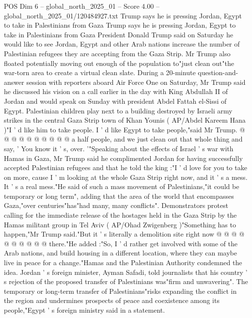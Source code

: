 \begin{textsample}{POS Dim 6 – global\_north\_2025\_01 – Score 4.00 – global\_north\_2025\_01/120484927.txt}  \label{ex:f6_pos_350}
Trump says he is pressing Jordan, Egypt to take in Palestinians from Gaza Trump says he is pressing Jordan, Egypt to take in Palestinians from Gaza President Donald Trump said on Saturday he would like to see Jordan, Egypt and other Arab nations increase the number of Palestinian refugees they are accepting from the Gaza Strip.
Mr Trump also floated potentially moving out enough of the population to"just clean out"the war-torn area to create a virtual clean slate.
During a 20-minute question-and-answer session with reporters aboard Air Force One on Saturday, Mr Trump said he discussed his vision on a call earlier in the day with King Abdullah II of Jordan and would speak on Sunday with president Abdel Fattah el-Sissi of Egypt.
Palestinian children play next to a building destroyed by Israeli army strikes in the central Gaza Strip town of Khan Younis ( AP/Abdel Kareem Hana )"I ' d like him to take people.
I ' d like Egypt to take people,"said Mr Trump. @ @ @ @ @ @ @ @ @ @ a half people, and we just clean out that whole thing and say, ' You know it ' s, over. '"Speaking about the effects of Israel ' s war with Hamas in Gaza, Mr Trump said he complimented Jordan for having successfully accepted Palestinian refugees and that he told the king :"I ' d love for you to take on more, cause I ' m looking at the whole Gaza Strip right now, and it ' s a mess.
It ' s a real mess."He said of such a mass movement of Palestinians,"it could be temporary or long term", adding that the area of the world that encompasses Gaza,"over centuries"has"had many, many conflicts".
Demonstrators protest calling for the immediate release of the hostages held in the Gaza Strip by the Hamas militant group in Tel Aviv ( AP/Ohad Zwigenberg )"Something has to happen,"Mr Trump said."But it ' s literally a demolition site right now @ @ @ @ @ @ @ @ @ @ there."He added :"So, I ' d rather get involved with some of the Arab nations, and build housing in a different location, where they can maybe live in peace for a change."Hamas and the Palestinian Authority condemned the idea.
Jordan ' s foreign minister, Ayman Safadi, told journalists that his country ' s rejection of the proposed transfer of Palestinians was"firm and unwavering".
The temporary or long-term transfer of Palestinians"risks expanding the conflict in the region and undermines prospects of peace and coexistence among its people,"Egypt ' s foreign ministry said in a statement.

\end{textsample}
